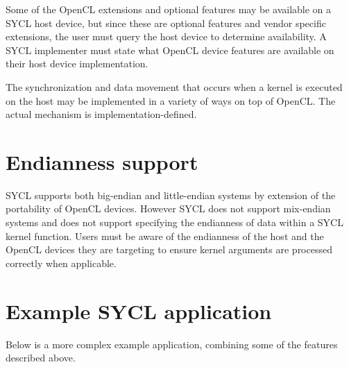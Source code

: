 Some of the OpenCL extensions and optional features may be available on a SYCL
host device, but since these are optional features and vendor specific
extensions, the user must query the host device to determine availability. A
SYCL implementer must state what OpenCL device features are available on
their host device implementation.

The synchronization and data movement that occurs when a kernel is executed on
the host may be implemented in a variety of ways
on top of OpenCL. The actual mechanism is implementation-defined.

\section{Endianness support}

SYCL supports both big-endian and little-endian systems by extension of the portability of OpenCL devices. However SYCL does not support mix-endian systems and does not support specifying the endianness of data within a SYCL kernel function. Users must be aware of the endianness of the host and the OpenCL devices they are targeting to ensure kernel arguments are processed correctly when applicable.

\section{Example SYCL application}

Below is a more complex example application, combining some of the features
described above.



